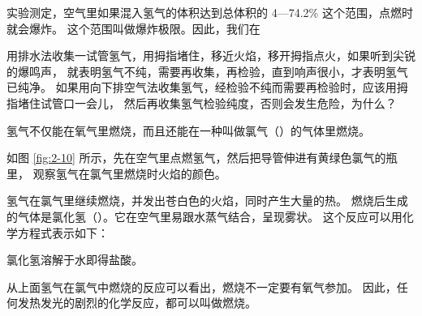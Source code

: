 实验测定，空气里如果混入氢气的体积达到总体积的 4—74.2\% 这个范围，点燃时就会爆炸。
这个范围叫做爆炸极限。因此，我们在

\begin{shiyan}
    用排水法收集一试管氢气，用拇指堵住，移近火焰，移开拇指点火，如果听到尖锐的爆鸣声，
    就表明氢气不纯，需要再收集，再检验，直到响声很小，才表明氢气已纯净。
    如果用向下排空气法收集氢气，经检验不纯而需要再检验时，应该用拇指堵住试管口一会儿，
    然后再收集氢气检验纯度，否则会发生危险，为什么\footnotemark ？
\end{shiyan}

氢气不仅能在氧气里燃烧，而且还能在一种叫做氯气（）的气体里燃烧。

\begin{shiyan}
    如图 \ref{fig:2-10} 所示，先在空气里点燃氢气，然后把导管伸进有黄绿色氯气的瓶里，
    观察氢气在氯气里燃烧时火焰的颜色。
\end{shiyan}

氢气在氯气里继续燃烧，并发出苍白色的火焰，同时产生大量的热。
燃烧后生成的气体是氯化氢（）。它在空气里易跟水蒸气结合，呈现雾状。
这个反应可以用化学方程式表示如下：
\begin{fangchengshi}
\end{fangchengshi}
氯化氢溶解于水即得盐酸。

从上面氢气在氯气中燃烧的反应可以看出，燃烧不一定要有氧气参加。
因此，任何发热发光的剧烈的化学反应，都可以叫做燃烧。

